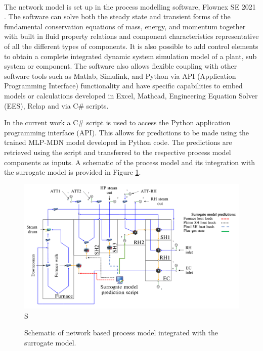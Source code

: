 \documentclass[a4paper,fleqn]{cas-dc}
\begin{document}
The network model is set up in the process modelling software, Flownex SE\textsuperscript{\textregistered} 2021 \cite{flownex}.  The software can solve both the steady state and transient forms of the fundamental conservation equations of mass, energy, and momentum together with built in fluid property relations and component characteristics representative of all the different types of components.  It is also possible to add control elements to obtain a complete integrated dynamic system simulation model of a plant, sub system or component. The software also allows flexible coupling with other software tools such as Matlab, Simulink, and Python via API (Application Programming Interface) functionality and have specific capabilities to embed models or calculations developed in Excel, Mathcad, Engineering Equation Solver (EES), Relap and via C\# scripts. 

In the current work a C\# script is used to access the Python application programming interface (API). This allows for predictions to be made using the trained MLP-MDN model developed in Python code. The predictions are retrieved using the script and transferred to the respective process model components as inputs. A schematic of the process model and its integration with the surrogate model is provided in Figure \ref{fig_int_model}.\\
\begin{figure}[h!]
	\centering
		\includegraphics[scale=0.15]{INTEGRATED_MODEL}S
	  \caption{Schematic of network based process model integrated with the surrogate model.}\label{fig_int_model}
\end{figure}
\end{document}
